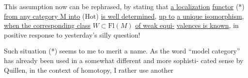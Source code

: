 This assumption now can be rephrased, by stating that \uline{a localization}
\uline{functor} \xout{(*)} (*) \uline{from any category M into} (Hot) \uline{is well determined}, \uline{up to}
\uline{a unique isomorphism}, \uline{when the corresponding class} $W \subset \mathrm{Fl}(M)$ \uline{of weak equi-}%
\uline{valences is known}, in positive response to yesterday's silly question!

Such situation (*) seems to me to merit a name. As the word ``model
category'' has already been used in a somewhat different and more sophisti-%
cated sense by Quillen, in the context of homotopy, I rather use another
